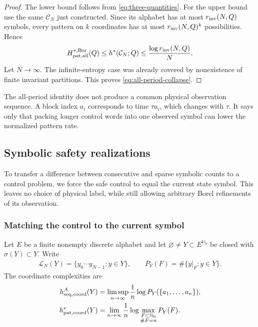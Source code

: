 \documentclass[11pt,reqno]{amsart}
\numberwithin{equation}{section}
\theoremstyle{definition}
\theoremstyle{definition}
\newcommand{\Nzero}{\mathbb N_0}
\newcommand{\C}{\mathcal C}
\newcommand{\Lcal}{\mathcal L}
\newcommand{\hpat}{h^{*}}
\newcommand{\Bor}{\mathrm{Bor}}
\begin{document}
\begin{proof}
The lower bound follows from
\eqref{eq:three-quantities}. For the upper bound use the same
$\C_N$ just constructed. Since its alphabet has at most
$r_{\rm inv}(N,Q)$ symbols, every pattern on $k$ coordinates has at most
$r_{\rm inv}(N,Q)^k$ possibilities. Hence
\begin{align*}
 H_{\rm pat,all}^{*,\Bor}(Q)
 \le\hpat(\C_N;Q)
 \le\frac{\log r_{\rm inv}(N,Q)}{N}.
\end{align*}
Let $N\to\infty$. The infinite-entropy case was already covered by
nonexistence of finite invariant partitions. This proves
\eqref{eq:all-period-collapse}.
\end{proof}

The all-period identity does not produce a common physical observation
sequence. A block index $a_i$ corresponds to time $\tau a_i$, which
changes with $\tau$. It says only that packing longer control words
into one observed symbol can lower the normalized pattern rate.

\subsection{Symbolic safety realizations}\label{sec:realization}

To transfer a difference between consecutive and sparse symbolic
counts to a control problem, we force the safe control to equal the
current state symbol. This leaves no choice of physical label, while
still allowing arbitrary Borel refinements of its observation.

\subsubsection{Matching the control to the current symbol}

Let $E$ be a finite nonempty discrete alphabet and let
$\varnothing\ne Y\subset E^{\Nzero}$ be closed with $\sigma(Y)\subset Y$.
Write
\begin{align*}
 \Lcal_N(Y)=\{y_0\cdots y_{N-1}:y\in Y\},
 \qquad
 P_Y(F)=\#\{y|_F:y\in Y\}.
\end{align*}
The coordinate complexities are
\begin{align*}
 h_{\rm seq,coord}^A(Y)
 &=\limsup_{n\to\infty}\frac1n
   \log P_Y(\{a_1,\ldots,a_n\}),\\
 h_{\rm pat,coord}^*(Y)
 &=\lim_{n\to\infty}\frac1n
   \log\max_{\substack{F\subset\Nzero\\\#F=n}}P_Y(F).
\end{align*}
\end{document}
